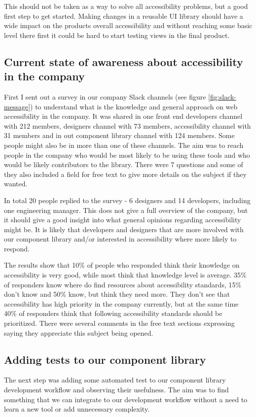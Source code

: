 \documentclass{master_thesis}
\begin{document}
This should not be taken as a way to solve all accessibility problems, but a good first step to get started. Making changes in a reusable UI library should have a wide impact on the products overall accessibility and without reaching some basic level there first it could be hard to start testing views in the final product.

\subsection{Current state of awareness about accessibility in the company}

First I sent out a survey in our company Slack channels (see figure \ref{fig:slack-message}) to understand what is the knowledge and general approach on web accessibility in the company. It was shared in one front end developers channel with 212 members, designers channel with 73 members, accessibility channel with 31 members and in out component library channel with 124 members. Some people might also be in more than one of these channels. The aim was to reach people in the company who would be most likely to be using these tools and who would be likely contributors to the library. There were 7 questions and some of they also included a field for free text to give more details on the subject if they wanted.

In total 20 people replied to the survey - 6 designers and 14 developers, including one engineering manager. This does not give a full overview of the company, but it should give a good insight into what general opinions regarding accessibility might be. It is likely that developers and designers that are more involved with our component library and/or interested in accessibility where more likely to respond.

The results show that 10\% of people who responded think their knowledge on accessibility is very good, while most think that knowledge level is average. 35\% of responders know where do find resources about accessibility standards, 15\% don't know and 50\% know, but think they need more. They don't see that accessibility has high priority in the company currently, but at the same time 40\% of responders think that following accessibility standards should be prioritized. There were several comments in the free text sections expressing saying they appreciate this subject being opened.

\subsection{Adding tests to our component library}
The next step was adding some automated test to our component library development workflow and observing their usefulness. The aim was to find something that we can integrate to our development workflow without a need to learn a new tool or add unnecessary complexity.
\end{document}
